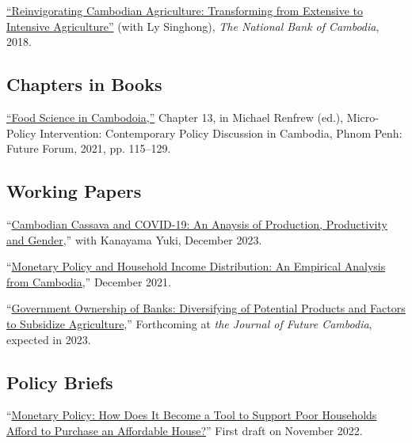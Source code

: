 \documentclass[10pt,a4paper]{article}
\begin{document}
	\href{https://ideas.repec.org/p/pra/mprapa/93086.html}{``Reinvigorating Cambodian Agriculture: Transforming from Extensive to Intensive Agriculture”} (with Ly Singhong), \textit{The National Bank of Cambodia}, 2018. \\ \vspace{-.5em}
			
\subsection*{Chapters in Books}

\href{https://kosalnith.github.io/research/policies/PolicyBrief-FST.pdf}{``Food Science in Cambodoia,''} Chapter 13, in Michael Renfrew (ed.), Micro-Policy Intervention: Contemporary Policy Discussion in Cambodia, Phnom Penh: Future Forum, 2021, pp. 115–129. 

\subsection*{Working Papers}

	“\href{}{Cambodian Cassava and COVID-19: An Anaysis of Production, Productivity and Gender},” with Kanayama Yuki, December 2023.\\ \vspace{-.5em}
	
	“\href{https://kosalnith.github.io/research/papers/MPHI.pdf}{Monetary Policy and Household Income Distribution: An Empirical Analysis from Cambodia},” December 2021.\\ \vspace{-.5em}
	
	“\href{https://kosalnith.github.io/research/papers/GOB.pdf}{Government Ownership of Banks: Diversifying of Potential Products and Factors to Subsidize Agriculture},” Forthcoming at \textit{the Journal of Future Cambodia}, expected in 2023.

\subsection*{Policy Briefs}
		“\href{}{Monetary Policy: How Does It Become a Tool to Support Poor Households Afford to Purchase an Affordable House?}” First draft on November 2022. \\ \vspace{-.5em}
	
\end{document}
